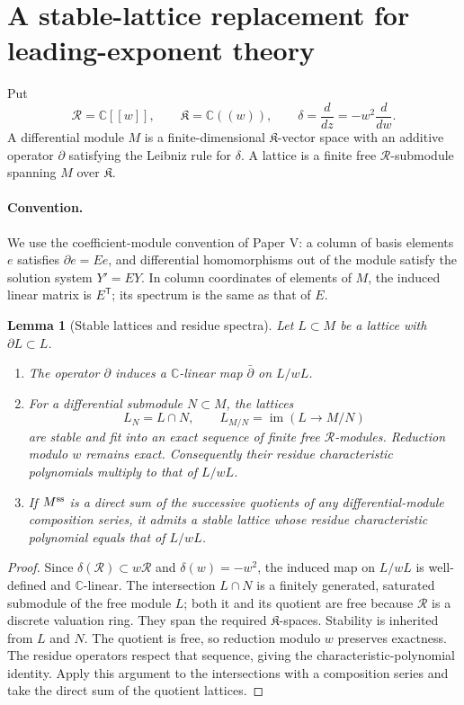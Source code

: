 \documentclass[11pt]{article}
\newtheorem{lemma}[proposition]{Lemma}
\newcommand{\C}{\mathbb C}
\newcommand{\K}{\mathfrak K}
\newcommand{\R}{\mathcal R}
\begin{document}
\section{A stable-lattice replacement for leading-exponent theory}
Put
\[
 \R=\C[[w]],\qquad \K=\C((w)),\qquad
 \delta=\frac d{dz}=-w^2\frac d{dw}.
\]
A differential module $M$ is a finite-dimensional $\K$-vector space with an additive operator $\partial$ satisfying the Leibniz rule for $\delta$. A lattice is a finite free $\R$-submodule spanning $M$ over $\K$.

\paragraph{Convention.} We use the coefficient-module convention of Paper V: a column of basis elements $e$ satisfies $\partial e=E e$, and differential homomorphisms out of the module satisfy the solution system $Y'=EY$. In column coordinates of elements of $M$, the induced linear matrix is $E^{\mathsf T}$; its spectrum is the same as that of $E$.

\begin{lemma}[Stable lattices and residue spectra]\label{lem:lattice}
Let $L\subset M$ be a lattice with $\partial L\subset L$.
\begin{enumerate}
\item The operator $\partial$ induces a $\C$-linear map $\bar\partial$ on $L/wL$.
\item For a differential submodule $N\subset M$, the lattices
\[
 L_N=L\cap N,\qquad L_{M/N}=\operatorname{im}(L\to M/N)
\]
are stable and fit into an exact sequence of finite free $\R$-modules. Reduction modulo $w$ remains exact. Consequently their residue characteristic polynomials multiply to that of $L/wL$.
\item If $M^{\rm ss}$ is a direct sum of the successive quotients of any differential-module composition series, it admits a stable lattice whose residue characteristic polynomial equals that of $L/wL$.
\end{enumerate}
\end{lemma}
\begin{proof}
Since $\delta(\R)\subset w\R$ and $\delta(w)=-w^2$, the induced map on $L/wL$ is well-defined and $\C$-linear. The intersection $L\cap N$ is a finitely generated, saturated submodule of the free module $L$; both it and its quotient are free because $\R$ is a discrete valuation ring. They span the required $\K$-spaces. Stability is inherited from $L$ and $N$. The quotient is free, so reduction modulo $w$ preserves exactness. The residue operators respect that sequence, giving the characteristic-polynomial identity. Apply this argument to the intersections with a composition series and take the direct sum of the quotient lattices.
\end{proof}
\end{document}
